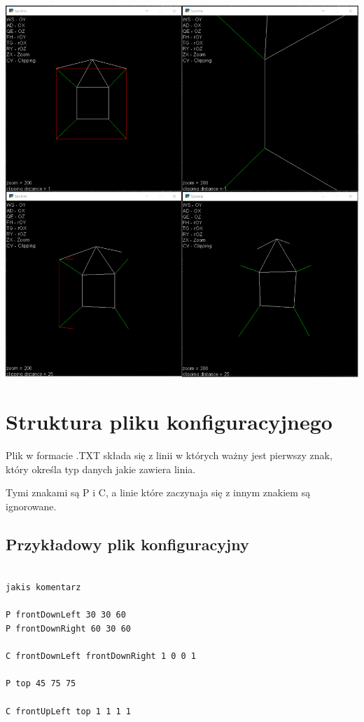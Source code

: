 \documentclass[12pt]{article}
\begin{document}
\begin{center}
    \noindent\includegraphics[scale=0.5]{spolens clip.png}
\end{center}

\newpage
\section{Struktura pliku konfiguracyjnego}
Plik w formacie .TXT składa się z linii w których ważny jest pierwszy znak, który określa typ danych jakie zawiera linia.

Tymi znakami są P i C, a linie które zaczynaja się z innym znakiem są ignorowane.

\subsection{Przykładowy plik konfiguracyjny}
\begin{lstlisting}[frame=single]  % Start your code-block

jakis komentarz

P frontDownLeft 30 30 60
P frontDownRight 60 30 60

C frontDownLeft frontDownRight 1 0 0 1

P top 45 75 75

C frontUpLeft top 1 1 1 1
\end{lstlisting}
\end{document}
